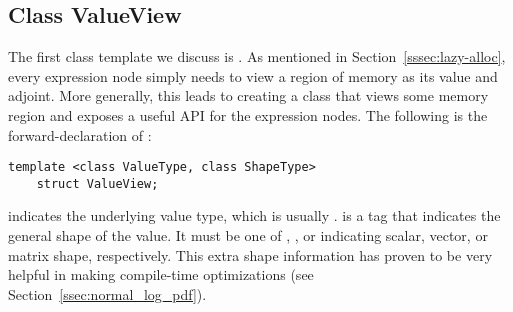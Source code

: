 \subsection{Class ValueView}\label{ssec:value_view}

The first class template we discuss is .
As mentioned in Section~\ref{sssec:lazy-alloc},
every expression node simply needs to view a region of memory as its value and adjoint.
More generally, this leads to creating a class that views some memory region
and exposes a useful API for the expression nodes.
The following is the forward-declaration of :
\begin{lstlisting}[style=customcpp]
    template <class ValueType, class ShapeType>
    struct ValueView;
\end{lstlisting}
 indicates the underlying value type, which is usually .
 is a tag that indicates the general shape of the value.
It must be one of , , or  
indicating scalar, vector, or matrix shape, respectively.
This extra shape information has proven to be very helpful in making compile-time optimizations
(see Section~\ref{ssec:normal_log_pdf}).

